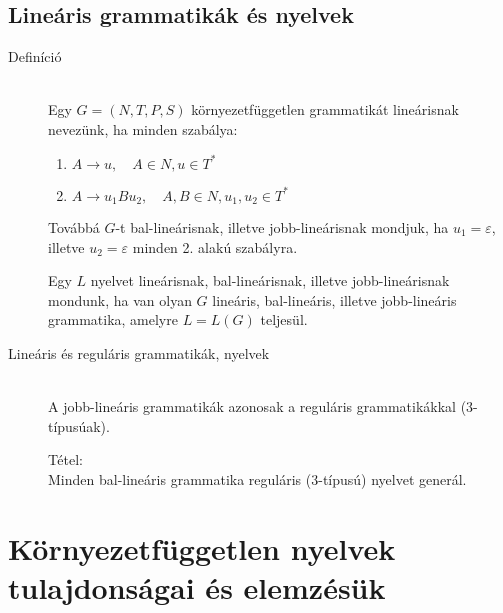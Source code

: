 \documentclass[margin=0px]{article}
\begin{document}
\subsection{Lineáris grammatikák és nyelvek}
\begin{description}
    \item[Definíció] \hfill \\
        Egy $G=(N,T,P,S)$ környezetfüggetlen grammatikát lineárisnak nevezünk, ha minden szabálya:
        \begin{enumerate}
            \item $A\rightarrow u, \quad A \in N, u \in T^*$
            \item $A\rightarrow u_1Bu_2, \quad A,B\in N, u_1,u_2 \in T^*$
        \end{enumerate}
        Továbbá $G$-t bal-lineárisnak, illetve jobb-lineárisnak mondjuk, ha $u_1 = \varepsilon$, illetve $u_2 = \varepsilon$ minden 2. alakú szabályra.

        Egy $L$ nyelvet lineárisnak, bal-lineárisnak, illetve jobb-lineárisnak mondunk,
        ha van olyan $G$ lineáris, bal-lineáris, illetve jobb-lineáris grammatika,
        amelyre $L = L(G)$ teljesül.
    \item[Lineáris és reguláris grammatikák, nyelvek] \hfill \\
        A jobb-lineáris grammatikák azonosak a reguláris grammatikákkal (3-típusúak).

        Tétel: \\
        Minden bal-lineáris grammatika reguláris (3-típusú) nyelvet generál.
\end{description}
\section{Környezetfüggetlen nyelvek tulajdonságai és elemzésük}
\end{document}
